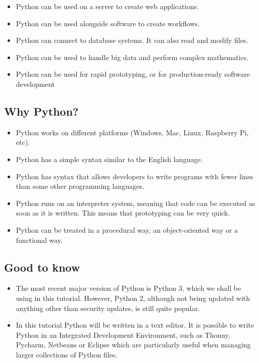\documentclass[12pt,a4paper]{article}
\begin{document}
\begin{itemize}
	\item Python can be used on a server to create web applications.
	\item Python can be used alongside software to create workflows.
	\item Python can connect to database systems. It can also read and modify files.
	\item Python can be used to handle big data and perform complex mathematics.
	\item Python can be used for rapid prototyping, or for production-ready software development
\end{itemize}

\subsection{Why Python?}

\begin{itemize}
	\item Python works on different platforms (Windows, Mac, Linux, Raspberry Pi, etc).
	\item Python has a simple syntax similar to the English language.
	\item Python has syntax that allows developers to write programs with fewer lines than some other programming languages.
	\item Python runs on an interpreter system, meaning that code can be executed as soon as it is written. This means that prototyping can be very quick.
	\item Python can be treated in a procedural way, an object-oriented way or a functional way.
\end{itemize}

\subsection{Good to know}

\begin{itemize}
	\item The most recent major version of Python is Python 3, which we shall be using in this tutorial. However, Python 2, although not being updated with anything other than security updates, is still quite popular.
	\item In this tutorial Python will be written in a text editor. It is possible to write Python in an Integrated Development Environment, such as Thonny, Pycharm, Netbeans or Eclipse which are particularly useful when managing larger collections of Python files.
\end{itemize}
\end{document}
